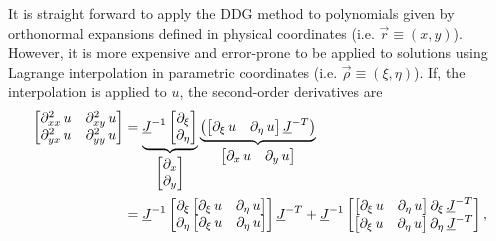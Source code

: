 \documentclass[10pt,draft]{article}
\begin{document}
%
It is straight forward to apply the DDG method to polynomials given by orthonormal expansions defined in physical coordinates (i.e. $\vec{r}\equiv(x,y)$).
%
However, it is more expensive and error-prone to be applied to solutions using Lagrange interpolation in parametric coordinates (i.e. $\vec{\rho}\equiv(\xi,\eta)$).
%
If, the interpolation is applied to $u$, the second-order derivatives are
$$
\begin{aligned}\begin{bmatrix}\partial_{xx}^{2}\,u & \partial_{xy}^{2}\,u\\
\partial_{yx}^{2}\,u & \partial_{yy}^{2}\,u
\end{bmatrix} & =\underbrace{\underline{J}^{-1}\begin{bmatrix}\partial_{\xi}\\
\partial_{\eta}
\end{bmatrix}}_{\begin{bmatrix}\partial_{x}\\
\partial_{y}
\end{bmatrix}}\underbrace{\left(\mathinner{\begin{bmatrix}\partial_{\xi}\,u & \partial_{\eta}\,u\end{bmatrix}}\underline{J}^{-T}\right)}_{\begin{bmatrix}\partial_{x}\,u & \partial_{y}\,u\end{bmatrix}}\\
 & =\underline{J}^{-1}\mathinner{\begin{bmatrix}\partial_{\xi}\mathinner{\begin{bmatrix}\partial_{\xi}\,u & \partial_{\eta}\,u\end{bmatrix}}\\
\partial_{\eta}\mathinner{\begin{bmatrix}\partial_{\xi}\,u & \partial_{\eta}\,u\end{bmatrix}}
\end{bmatrix}}\underline{J}^{-T}+\underline{J}^{-1}\begin{bmatrix}\mathinner{\begin{bmatrix}\partial_{\xi}\,u & \partial_{\eta}\,u\end{bmatrix}}\partial_{\xi}\,\underline{J}^{-T}\\
\mathinner{\begin{bmatrix}\partial_{\xi}\,u & \partial_{\eta}\,u\end{bmatrix}}\partial_{\eta}\,\underline{J}^{-T}
\end{bmatrix},
\end{aligned}
$$
\end{document}
